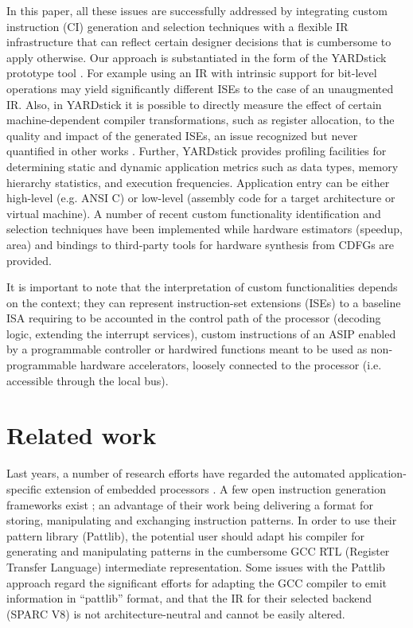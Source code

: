 \documentclass{comjnl}
\begin{document}
In this paper, all these issues are successfully addressed by integrating custom instruction (CI) generation and selection techniques with a flexible IR infrastructure that can reflect certain designer decisions that is cumbersome to apply otherwise. Our approach is substantiated in the form of the YARDstick prototype tool \cite{Kavvadias07}. For example using an IR with intrinsic support for bit-level operations may yield significantly different ISEs to the case of an unaugmented IR. Also, in YARDstick it is possible to directly measure the effect of certain machine-dependent compiler transformations, such as register allocation, to the quality and impact of the generated ISEs, an issue recognized but never quantified in other works \cite{ClarkN03,Castro04}. Further, YARDstick provides profiling facilities for determining static and dynamic application metrics such as data types, memory hierarchy statistics, and execution frequencies. Application entry can be either high-level (e.g. ANSI C) or low-level (assembly code for a target architecture or virtual machine). A number of recent custom functionality identification and selection techniques have been implemented while hardware estimators (speedup, area) and bindings to third-party tools for hardware synthesis from CDFGs are provided. 

It is important to note that the interpretation of custom functionalities depends on the context; they can represent instruction-set extensions (ISEs) to a baseline ISA requiring to be accounted in the control path of the processor (decoding logic, extending the interrupt services), custom instructions of an ASIP enabled by a programmable controller or hardwired functions meant to be used as non-programmable hardware accelerators, loosely connected to the processor (i.e. accessible through the local bus).

\section{Related work}
\label{Sec:RelatedWork}
Last years, a number of research efforts have regarded the automated application-specific 
extension of embedded processors \cite{Alippi99,Yu04a,ClarkN05,Goodwin03,Pozzi06,Biswas07,Pothineni07}. 
A few open instruction generation frameworks exist \cite{Pattlib}; an 
advantage of their work being delivering a format for storing, manipulating and 
exchanging instruction patterns. In order to use their pattern library (Pattlib), the 
potential user should adapt his compiler for generating and manipulating patterns in 
the cumbersome GCC RTL (Register Transfer Language) \cite{GCC} intermediate representation. Some issues with the Pattlib approach regard the significant efforts for adapting the GCC compiler to emit information in ``pattlib'' format, and that the IR for their selected backend (SPARC V8) is not architecture-neutral and cannot be easily altered. 
 
\end{document}
